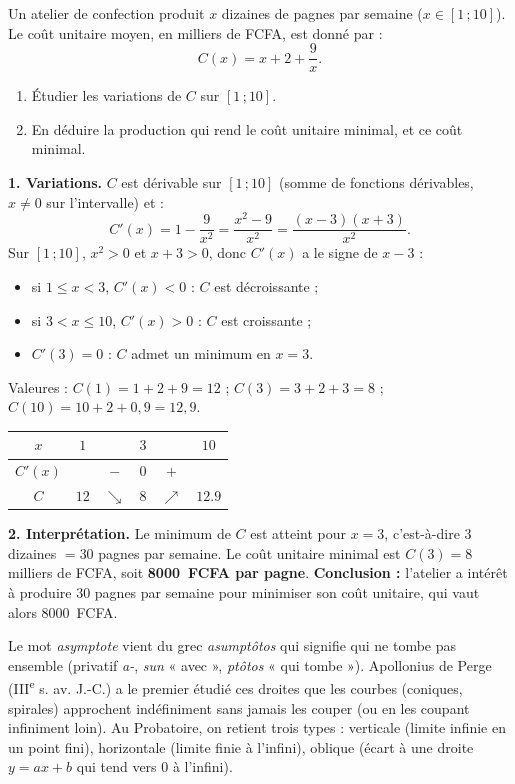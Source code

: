 \documentclass[11pt]{article}
\begin{document}
\begin{exoresolu}
Un atelier de confection produit $x$ dizaines de pagnes par semaine ($x\in[1\,;10]$). Le coût unitaire moyen, en milliers de FCFA, est donné par :
\[ C(x)=x+2+\frac{9}{x}. \]
\begin{enumerate}
\item Étudier les variations de $C$ sur $[1\,;10]$.
\item En déduire la production qui rend le coût unitaire minimal, et ce coût minimal.
\end{enumerate}
\tcblower
\textbf{1. Variations.} $C$ est dérivable sur $[1\,;10]$ (somme de fonctions dérivables, $x\neq 0$ sur l'intervalle) et :
\[ C'(x)=1-\frac{9}{x^2}=\frac{x^2-9}{x^2}=\frac{(x-3)(x+3)}{x^2}. \]
Sur $[1\,;10]$, $x^2>0$ et $x+3>0$, donc $C'(x)$ a le signe de $x-3$ :
\begin{itemize}
\item si $1\leq x<3$, $C'(x)<0$ : $C$ est décroissante ;
\item si $3<x\leq 10$, $C'(x)>0$ : $C$ est croissante ;
\item $C'(3)=0$ : $C$ admet un minimum en $x=3$.
\end{itemize}
Valeures : $C(1)=1+2+9=12$ ; $C(3)=3+2+3=8$ ; $C(10)=10+2+0,9=12,9$.

\begin{center}
\begin{tabular}{|c|ccccc|}\hline
$x$ & $1$ & & $3$ & & $10$ \\ \hline
$C'(x)$ & & $-$ & $0$ & $+$ & \\ \hline
$C$ & $12$ & $\searrow$ & $8$ & $\nearrow$ & $\num{12,9}$ \\ \hline
\end{tabular}
\end{center}

\textbf{2. Interprétation.} Le minimum de $C$ est atteint pour $x=3$, c'est-à-dire $3$ dizaines $=30$ pagnes par semaine. Le coût unitaire minimal est $C(3)=8$ milliers de FCFA, soit \textbf{\SI{8000}{FCFA} par pagne}.
\textbf{Conclusion :} l'atelier a intérêt à produire $30$ pagnes par semaine pour minimiser son coût unitaire, qui vaut alors \SI{8000}{FCFA}.
\end{exoresolu}

\begin{savaistu}
Le mot \emph{asymptote} vient du grec \og \textit{asumptôtos} \fg{} qui signifie \og qui ne tombe pas ensemble \fg{} (privatif \textit{a-}, \textit{sun} « avec », \textit{ptôtos} « qui tombe »). Apollonius de Perge (III\textsuperscript{e} s. av. J.-C.) a le premier étudié ces droites que les courbes (coniques, spirales) approchent indéfiniment sans jamais les couper (ou en les coupant infiniment loin). Au Probatoire, on retient trois types : verticale (limite infinie en un point fini), horizontale (limite finie à l'infini), oblique (écart à une droite $y=ax+b$ qui tend vers $0$ à l'infini).
\end{savaistu}
\end{document}
